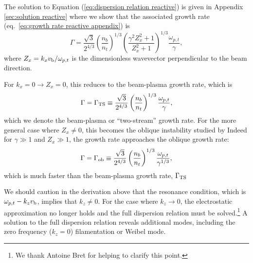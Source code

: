\documentclass[usenatbib,iop,apj,numberedappendix]{aeb_emulateapj_2015}
\newcommand{\vbeam}{\ensuremath{v_{\rm b}}}
\begin{document}
The solution to Equation (\ref{eq:dispersion relation reactive}) is given in Appendix \ref{sec:solution reactive} where we show that the associated growth rate (eq.~\ref{eq:growth rate reactive appendix}) is 
\begin{equation}\label{eq:growth rate reactive}
 \Gamma = \frac{\sqrt{3}}{2^{4/3}}\left(\frac{n_b}{n_t}\right)^{1/3}\left(\frac{\gamma^2 Z_x^2 + 1}{Z_x^2 + 1}\right)^{1/3}\frac{\omega_{p,t}}{\gamma},
\end{equation}
where $Z_x = k_x\vbeam/\omega_{p,t}$ is the dimensionless wavevector perpendicular to the beam direction.

For $k_x = 0 \rightarrow Z_x = 0$, this reduces to the beam-plasma growth rate, which is
\begin{equation}\label{eq:growth rate bp}
 \Gamma = \Gamma_{\rm TS} \equiv \frac{\sqrt{3}}{2^{4/3}}\left(\frac{n_b}{n_t}\right)^{1/3}\frac{\omega_{p,t}}{\gamma},
\end{equation}
which we denote the beam-plasma or ``two-stream'' growth rate.
For the more general case where $Z_x\ne 0$, this becomes the oblique instability studied by \citet{Bret-Grem-Beni:10}  Indeed for $\gamma \gg 1$ and $Z_x\gg1$, the growth rate approaches the oblique growth rate:
\begin{equation}
 \Gamma = \Gamma_{\rm ob} \equiv \frac{\sqrt{3}}{2^{4/3}}\left(\frac{n_b}{n_t}\right)^{1/3}\frac{\omega_{p,t}}{\gamma^{1/3}},
\end{equation}
which is much faster than the beam-plasma growth rate, $\Gamma_{\rm TS}$

We should caution in the derivation above that the resonance condition, which is $\omega_{p,t} - k_z \vbeam$, implies that $k_z \neq 0$.  For the case where $k_z \rightarrow 0$, the electrostatic approximation no longer holds and the full dispersion relation must be solved.\footnote{We thank Antoine Bret for helping to clarify this point.}  A solution to the full dispersion relation reveals additional modes, including the zero frequency ($k_z = 0$) filamentation or Weibel mode. 
\end{document}
